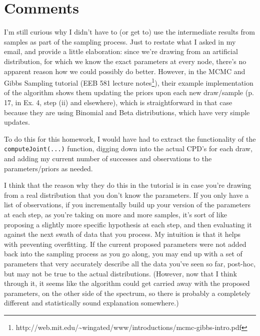 \documentclass[11pt]{report}
\begin{document}
\section{Comments}

I'm still curious why I didn't have to (or get to) use the intermediate results from samples as part of the sampling process. Just to restate what I asked in my email, and provide a little elaboration: since we're drawing from an artificial distribution, for which we know the exact parameters at every node, there's no apparent reason how we could possibly do better. However, in the MCMC and Gibbs Sampling tutorial (EEB 581 lecture notes\footnote{http://web.mit.edu/\~{}wingated/www/introductions/mcmc-gibbs-intro.pdf}), their example implementation of the algorithm shows them updating the priors upon each new draw/sample (p. 17, in Ex. 4, step (ii) and elsewhere), which is straightforward in that case because they are using Binomial and Beta distributions, which have very simple updates.

To do this for this homework, I would have had to extract the functionality of the \texttt{computeJoint(...)} function, digging down into the actual CPD's for each draw, and adding my current number of successes and observations to the parameters/priors as needed.

I think that the reason why they do this in the tutorial is in case you're drawing from a real distribution that you don't know the parameters. If you only have a list of observations, if you incrementally build up your version of the parameters at each step, as you're taking on more and more samples, it's sort of like proposing a slightly more specific hypothesis at each step, and then evaluating it against the next swath of data that you process. My intuition is that it helps with preventing overfitting. If the current proposed parameters were not added back into the sampling process as you go along, you may end up with a set of parameters that very accurately describe all the data you've seen so far, post-hoc, but may not be true to the actual distributions. (However, now that I think through it, it seems like the algorithm could get carried away with the proposed parameters, on the other side of the spectrum, so there is probably a completely different and statistically sound explanation somewhere.)
\end{document}
